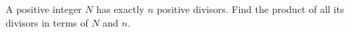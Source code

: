 A positive integer $N$ has exactly $n$ positive divisors. Find the product of all its divisors in terms of $N$ and $n$.
